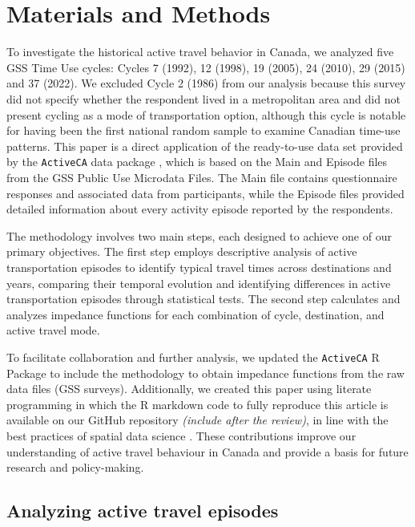 \documentclass[preprint, 3p,
authoryear]{elsarticle} %
\begin{document}
\section{Materials and Methods}\label{materials-and-methods}

To investigate the historical active travel behavior in Canada, we
analyzed five GSS Time Use cycles: Cycles 7 (1992), 12 (1998), 19
(2005), 24 (2010), 29 (2015) and 37 (2022). We excluded Cycle 2 (1986)
from our analysis because this survey did not specify whether the
respondent lived in a metropolitan area and did not present cycling as a
mode of transportation option, although this cycle is notable for having
been the first national random sample to examine Canadian time-use
patterns. This paper is a direct application of the ready-to-use data
set provided by the \texttt{ActiveCA} data package
\citeyearpar{dossantos2024ActiveCA}, which is based on the Main and
Episode files from the GSS Public Use Microdata Files. The Main file
contains questionnaire responses and associated data from participants,
while the Episode files provided detailed information about every
activity episode reported by the respondents.

The methodology involves two main steps, each designed to achieve one of
our primary objectives. The first step employs descriptive analysis of
active transportation episodes to identify typical travel times across
destinations and years, comparing their temporal evolution and
identifying differences in active transportation episodes through
statistical tests. The second step calculates and analyzes impedance
functions for each combination of cycle, destination, and active travel
mode.

To facilitate collaboration and further analysis, we updated the
\texttt{ActiveCA} R Package to include the methodology to obtain
impedance functions from the raw data files (GSS surveys). Additionally,
we created this paper using literate programming in which the R markdown
code to fully reproduce this article is available on our GitHub
repository \emph{(include after the review)}, in line with the best
practices of spatial data science \citep{arribas-bel2021, páez2021}.
These contributions improve our understanding of active travel behaviour
in Canada and provide a basis for future research and policy-making.

\subsection{Analyzing active travel
episodes}\label{analyzing-active-travel-episodes}
\end{document}
